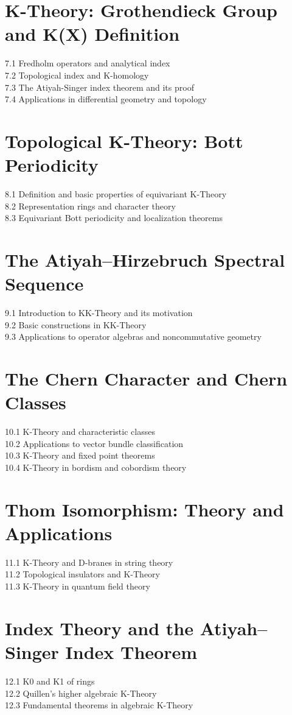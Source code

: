\section{K-Theory: Grothendieck Group and K(X) Definition}
7.1 Fredholm operators and analytical index\\
7.2 Topological index and K-homology\\
7.3 The Atiyah-Singer index theorem and its proof\\
7.4 Applications in differential geometry and topology
\section{Topological K-Theory: Bott Periodicity}
8.1 Definition and basic properties of equivariant K-Theory\\
8.2 Representation rings and character theory\\
8.3 Equivariant Bott periodicity and localization theorems
\section{The Atiyah–Hirzebruch Spectral Sequence}
9.1 Introduction to KK-Theory and its motivation\\
9.2 Basic constructions in KK-Theory\\
9.3 Applications to operator algebras and noncommutative geometry
\section{The Chern Character and Chern Classes}
10.1 K-Theory and characteristic classes\\
10.2 Applications to vector bundle classification\\
10.3 K-Theory and fixed point theorems\\
10.4 K-Theory in bordism and cobordism theory
\section{Thom Isomorphism: Theory and Applications}
11.1 K-Theory and D-branes in string theory\\
11.2 Topological insulators and K-Theory\\
11.3 K-Theory in quantum field theory
\section{Index Theory and the Atiyah–Singer Index Theorem}
12.1 K0 and K1 of rings\\
12.2 Quillen's higher algebraic K-Theory\\
12.3 Fundamental theorems in algebraic K-Theory
